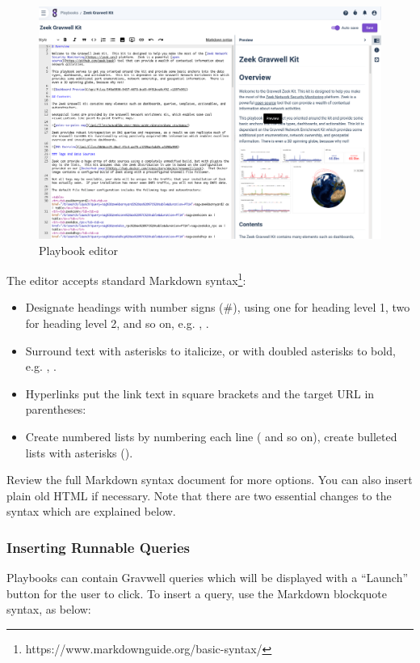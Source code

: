 \begin{figure}
	\includegraphics[width=0.8\linewidth]{images/playbook-edit.png}
	\caption{Playbook editor}
	\label{fig:playbook-edit}
\end{figure}

The editor accepts standard Markdown syntax\footnote{https://www.markdownguide.org/basic-syntax/}:

\begin{itemize}
\item Designate headings with number signs (\#), using one for heading level 1, two for heading level 2, and so on, e.g. , .
\item Surround text with asterisks to italicize, or with doubled asterisks to bold, e.g. , .
\item Hyperlinks put the link text in square brackets and the target URL in parentheses: 
\item Create numbered lists by numbering each line ( and so on), create bulleted lists with asterisks ().
\end{itemize}

Review the full Markdown syntax document for more options. You can also insert plain old HTML if necessary. Note that there are two essential changes to the syntax which are explained below.

\subsubsection{Inserting Runnable Queries}

Playbooks can contain Gravwell queries which will be displayed with a ``Launch'' button for the user to click. To insert a query, use the Markdown blockquote syntax, as below:

